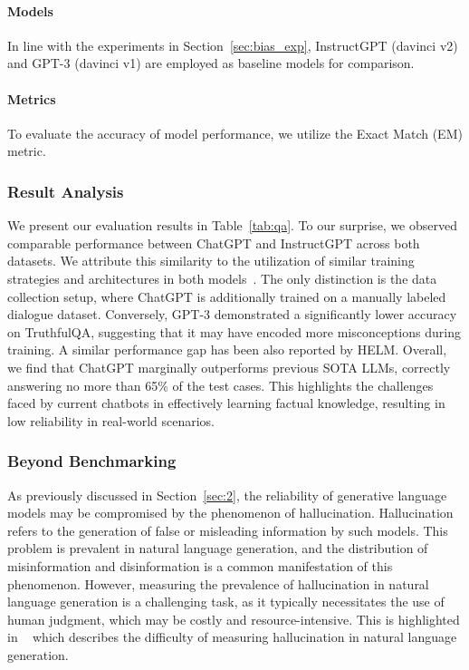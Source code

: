 \paragraph{Models} In line with the experiments in Section~\ref{sec:bias_exp}, InstructGPT (davinci v2) and GPT-3 (davinci v1) are employed as baseline models for comparison.

\paragraph{Metrics} To evaluate the accuracy of model performance, we utilize the Exact Match (EM) metric.

\subsubsection{\textbf{Result Analysis}}
\hfill \break


We present our evaluation results in Table~\ref{tab:qa}. To our surprise, we observed comparable performance between ChatGPT and InstructGPT across both datasets. We attribute this similarity to the utilization of similar training strategies and architectures in both models~\cite{openai-chatgpt}. The only distinction is the data collection setup, where ChatGPT is additionally trained on a manually labeled dialogue dataset. Conversely, GPT-3 demonstrated a significantly lower accuracy on TruthfulQA, suggesting that it may have encoded more misconceptions during training. A similar performance gap has been also reported by HELM. Overall, we find that ChatGPT marginally outperforms previous SOTA LLMs, correctly answering no more than 65\% of the test cases. This highlights the challenges faced by current chatbots in effectively learning factual knowledge, resulting in low reliability in real-world scenarios.


\subsubsection{\textbf{Beyond Benchmarking}}
\hfill

As previously discussed in Section~\ref{sec:2}, the reliability of generative language models may be compromised by the phenomenon of hallucination. Hallucination refers to the generation of false or misleading information by such models. This problem is prevalent in natural language generation, and the distribution of misinformation and disinformation is a common manifestation of this phenomenon. However, measuring the prevalence of hallucination in natural language generation is a challenging task, as it typically necessitates the use of human judgment, which may be costly and resource-intensive. This is highlighted in ~\cite{ji2022survey} which describes the difficulty of measuring hallucination in natural language generation.

